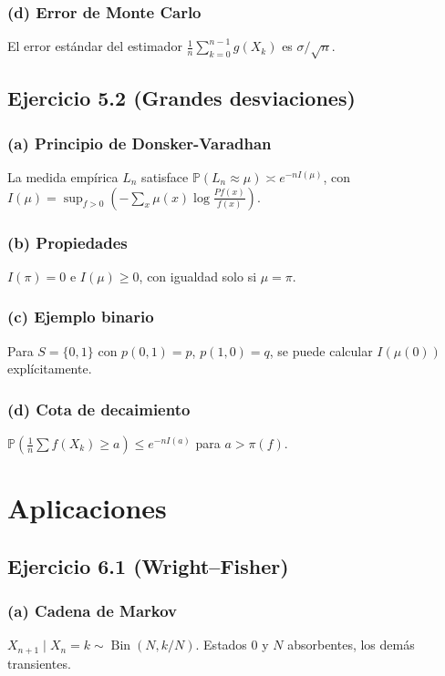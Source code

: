 \documentclass[letterpaper, 12pt]{article}
\renewcommand{\P}{\mathbb{P}}
\newcommand{\1}{\mathbbm{1}}
\DeclareMathOperator{\Bin}{Bin}
\begin{document}
    \subsubsection*{(d) Error de Monte Carlo}
    El error est\'andar del estimador $\frac1n\sum_{k=0}^{n-1}g(X_k)$ es $\sigma/\sqrt{n}$.

    \subsection{Ejercicio 5.2 (Grandes desviaciones)}

    \subsubsection*{(a) Principio de Donsker-Varadhan}
    La medida emp\'irica $L_n$ satisface $\P(L_n\approx\mu)\asymp e^{-nI(\mu)}$, con $I(\mu)=\sup_{f>0}\left(-\sum_x\mu(x)\log\frac{Pf(x)}{f(x)}\right)$.

    \subsubsection*{(b) Propiedades}
    $I(\pi)=0$ e $I(\mu)\ge0$, con igualdad solo si $\mu=\pi$.

    \subsubsection*{(c) Ejemplo binario}
    Para $S=\{0,1\}$ con $p(0,1)=p$, $p(1,0)=q$, se puede calcular $I(\mu(0))$ expl\'icitamente.

    \subsubsection*{(d) Cota de decaimiento}
    $\P(\frac1n\sum f(X_k)\ge a)\le e^{-n I(a)}$ para $a>\pi(f)$.

    \section{Aplicaciones}

    \subsection{Ejercicio 6.1 (Wright–Fisher)}

    \subsubsection*{(a) Cadena de Markov}
    $X_{n+1}\mid X_n=k\sim\Bin(N,k/N)$. Estados $0$ y $N$ absorbentes, los dem\'as transientes.
\end{document}
